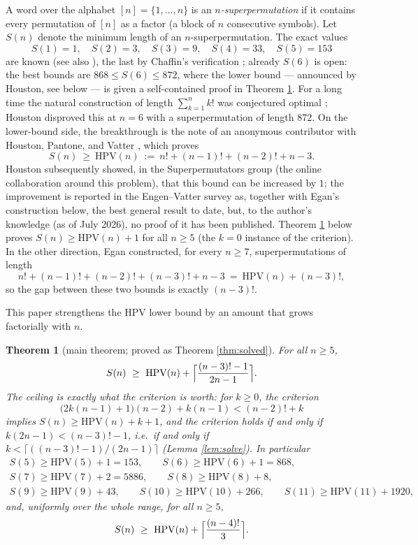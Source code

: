 \documentclass[11pt]{article}
\newtheorem{theorem}{Theorem}
\newcommand{\HPV}{\mathrm{HPV}}
\begin{document}
A word over the alphabet \([n]=\{1,\ldots,n\}\) is an \emph{\(n\)-superpermutation} if it contains
every permutation of \([n]\) as a factor (a block of \(n\) consecutive symbols).  Let \(S(n)\)
denote the minimum length of an \(n\)-superpermutation.  The exact values
\[
  S(1)=1,\quad S(2)=3,\quad S(3)=9,\quad S(4)=33,\quad S(5)=153
\]
are known (see also \cite{J2013}), the last by Chaffin's verification \cite{JohnstonBlog,OEIS}; already \(S(6)\) is open: the
best bounds are \(868\le S(6)\le 872\), where the lower bound --- announced by Houston, see
below --- is given a self-contained proof in Theorem \ref{thm:intromain}.  For a
long time the natural construction of length \(\sum_{k=1}^{n}k!\) was conjectured optimal
\cite{AT}; Houston \cite{Houston} disproved this at \(n=6\) with a superpermutation of length
\(872\).  On the lower-bound side, the breakthrough is the note of an anonymous contributor with
Houston, Pantone, and Vatter \cite{HPV}, which proves
\[
  S(n)\ \ge\ \HPV(n)\ :=\ n!+(n-1)!+(n-2)!+n-3 .
\]
Houston subsequently showed, in the Superpermutators group (the online collaboration around
this problem), that this bound can be increased by
\(1\); the improvement is reported in the Engen--Vatter survey \cite{EV} as, together with
Egan's construction below, the best general result to date, but, to the author's knowledge
(as of July 2026), no proof of it has been
published.  Theorem \ref{thm:intromain} below proves \(S(n)\ge\HPV(n)+1\) for all
\(n\ge 5\) (the \(k=0\) instance of the criterion).
In the other direction, Egan \cite{Egan} constructed, for every \(n\ge 7\), superpermutations of
length
\[
  n!+(n-1)!+(n-2)!+(n-3)!+n-3\ =\ \HPV(n)+(n-3)!,
\]
so the gap between these two bounds is exactly \((n-3)!\).

This paper strengthens the HPV lower bound by an amount that grows factorially with \(n\).

\begin{theorem}[main theorem; proved as Theorem \ref{thm:solved}]
\label{thm:intromain}
For all \(n\ge 5\),
\[
  S(n)\ \ge\ \HPV(n)+\Bigl\lceil\frac{(n-3)!-1}{2n-1}\Bigr\rceil .
\]
The ceiling is exactly what the criterion is worth: for \(k\ge 0\), the
\emph{criterion}
\[
  \bigl(2k(n-1)+1\bigr)(n-2)+k(n-1)<(n-2)!+k
\]
implies \(S(n)\ge \HPV(n)+k+1\), and the criterion holds if and only if
\(k(2n-1)<(n-3)!-1\), i.e.\ if and only if \(k<\bigl\lceil((n-3)!-1)/(2n-1)\bigr\rceil\)
(Lemma \ref{lem:solve}).  In particular
\begin{gather*}
  S(5)\ge\HPV(5)+1=153,\qquad
  S(6)\ge\HPV(6)+1=868,\\
  S(7)\ge\HPV(7)+2=5886,\qquad
  S(8)\ge\HPV(8)+8,\\
  S(9)\ge\HPV(9)+43,\qquad
  S(10)\ge\HPV(10)+266,\qquad
  S(11)\ge\HPV(11)+1920,
\end{gather*}
and, uniformly over the whole range, for all \(n\ge5\),
\[
  S(n)\ \ge\ \HPV(n)+\Bigl\lceil\frac{(n-4)!}{3}\Bigr\rceil .
\]
\end{theorem}
\end{document}
